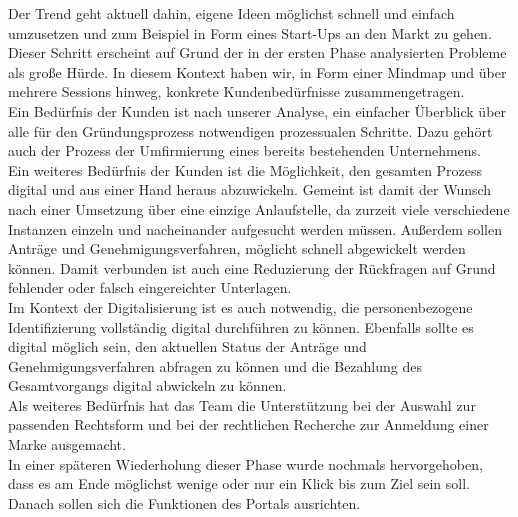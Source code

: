 Der Trend geht aktuell dahin, eigene Ideen möglichst schnell und einfach umzusetzen und zum Beispiel in Form eines Start-Ups an den Markt zu gehen. Dieser Schritt erscheint auf Grund der in der ersten Phase analysierten Probleme als große Hürde. In diesem Kontext haben wir, in Form einer Mindmap und über mehrere Sessions hinweg, konkrete Kundenbedürfnisse zusammengetragen.\\
Ein Bedürfnis der Kunden ist nach unserer Analyse, ein einfacher Überblick über alle für den Gründungsprozess notwendigen prozessualen Schritte. Dazu gehört auch der Prozess der Umfirmierung eines bereits bestehenden Unternehmens.\\
Ein weiteres Bedürfnis der Kunden ist die Möglichkeit, den gesamten Prozess digital und aus einer Hand heraus abzuwickeln. Gemeint ist damit der Wunsch nach einer Umsetzung über eine einzige Anlaufstelle, da zurzeit viele verschiedene Instanzen einzeln und nacheinander aufgesucht werden müssen. Außerdem sollen Anträge und Genehmigungsverfahren, möglicht schnell abgewickelt werden können. Damit verbunden ist auch eine Reduzierung der Rückfragen auf Grund fehlender oder falsch eingereichter Unterlagen.\\
Im Kontext der Digitalisierung ist es auch notwendig, die personenbezogene Identifizierung vollständig digital durchführen zu können. Ebenfalls sollte es digital möglich sein, den aktuellen Status der Anträge und Genehmigungsverfahren abfragen zu können und die Bezahlung des Gesamtvorgangs digital abwickeln zu können.\\
Als weiteres Bedürfnis hat das Team die Unterstützung bei der Auswahl zur passenden Rechtsform und bei der rechtlichen Recherche zur Anmeldung einer Marke ausgemacht.\\
In einer späteren Wiederholung dieser Phase wurde nochmals hervorgehoben, dass es am Ende möglichst wenige oder nur ein Klick bis zum Ziel sein soll. Danach sollen sich die Funktionen des Portals ausrichten.\\